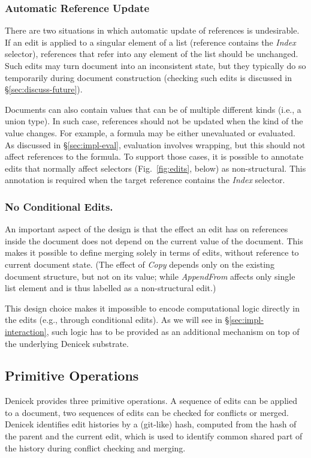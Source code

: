 \documentclass[sigconf]{acmart}
\begin{document}

\subsubsection*{Automatic Reference Update}
There are two situations in which automatic update of references is undesirable. If an edit is
applied to a singular element of a list (reference contains the \textit{Index} selector),
references that refer into any element of the list should be unchanged.  Such edits may turn
document into an inconsistent state, but they typically do so temporarily during document
construction (checking such edits is discussed in \S\ref{sec:discuss-future}).

Documents can also contain values that can be of multiple different kinds (i.e., a union type).
In such case, references should not be updated when the kind of the value changes. For example,
a formula may be either unevaluated or evaluated. As discussed in \S\ref{sec:impl-eval}, evaluation
involves wrapping, but this should not affect references to the formula.
To support those cases, it is possible to annotate edits that normally affect selectors
(Fig.~\ref{fig:edits}, below) as non-structural. This annotation is required when the
target reference contains the \emph{Index} selector.

\subsubsection*{No Conditional Edits.}
An important aspect of the design is that the effect an edit has on references inside
the document does not depend on the current value of the document. This makes it possible to
define merging solely in terms of edits, without reference to current document state.
(The effect of \textit{Copy} depends only on the existing document structure, but not on its value;
while \textit{AppendFrom} affects only single list element and is thus labelled as a
non-structural edit.)

This design choice makes it impossible to encode computational logic directly in the edits
(e.g., through conditional edits). As we will see in \S\ref{sec:impl-interaction}, such logic
has to be provided as an additional  mechanism on top of the underlying Denicek substrate.

\subsection{Primitive Operations}
Denicek provides three primitive operations. A sequence of edits can be applied to a document, two
sequences of edits can be checked for conflicts or merged. Denicek identifies edit histories by
a (git-like) hash, computed from the hash of the parent and the current edit, which is used to identify
common shared part of the history during conflict checking and merging.
\end{document}
